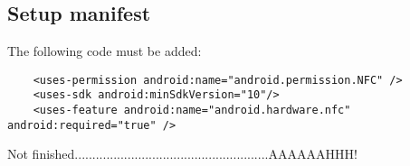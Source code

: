 \subsection{Setup manifest}

The following code must be added:
\begin{lstlisting}
    <uses-permission android:name="android.permission.NFC" />
    <uses-sdk android:minSdkVersion="10"/>
    <uses-feature android:name="android.hardware.nfc" android:required="true" />
\end{lstlisting}

Not finished.......................................................AAAAAAHHH!




